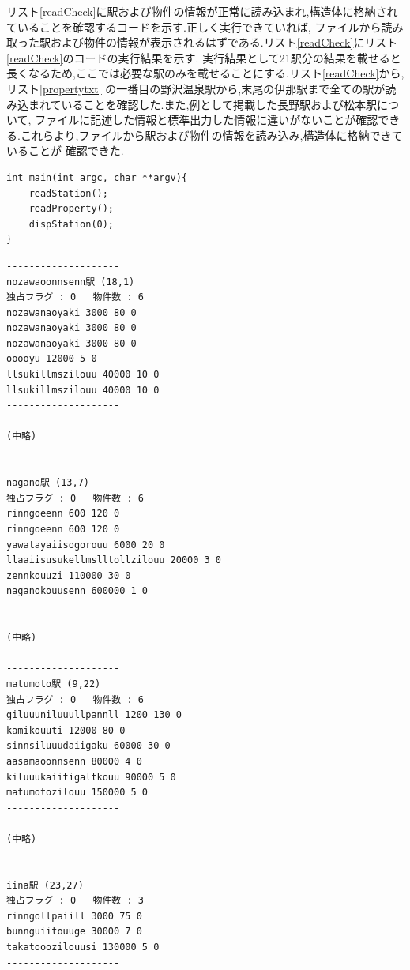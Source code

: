 \documentclass[a4j]{jarticle}
\begin{document}
    リスト\ref{readCheck}に駅および物件の情報が正常に読み込まれ,構造体に格納されていることを確認するコードを示す.正しく実行できていれば,
    ファイルから読み取った駅および物件の情報が表示されるはずである.リスト\ref{readCheck}にリスト\ref{readCheck}のコードの実行結果を示す.
    実行結果として21駅分の結果を載せると長くなるため,ここでは必要な駅のみを載せることにする.リスト\ref{readCheck}から,リスト\ref{propertytxt}
    の一番目の野沢温泉駅から,末尾の伊那駅まで全ての駅が読み込まれていることを確認した.また,例として掲載した長野駅および松本駅について,
    ファイルに記述した情報と標準出力した情報に違いがないことが確認できる.これらより,ファイルから駅および物件の情報を読み込み,構造体に格納できていることが
    確認できた.
    \begin{lstlisting}[basicstyle=\ttfamily\footnotesize, frame=single,label=readCheck,caption=駅および物件読み込みの動作確認]
int main(int argc, char **argv){
    readStation();
    readProperty();
    dispStation(0);
}
          \end{lstlisting} 

    \begin{lstlisting}[basicstyle=\ttfamily\footnotesize, frame=single,label=readResult,caption=リスト\ref{readCheck}の実行結果]
--------------------
nozawaoonnsenn駅 (18,1)
独占フラグ : 0   物件数 : 6
nozawanaoyaki 3000 80 0
nozawanaoyaki 3000 80 0
nozawanaoyaki 3000 80 0
ooooyu 12000 5 0
llsukillmszilouu 40000 10 0
llsukillmszilouu 40000 10 0
--------------------

(中略)

--------------------
nagano駅 (13,7)
独占フラグ : 0   物件数 : 6
rinngoeenn 600 120 0
rinngoeenn 600 120 0
yawatayaiisogorouu 6000 20 0
llaaiisusukellmslltollzilouu 20000 3 0
zennkouuzi 110000 30 0
naganokouusenn 600000 1 0
--------------------

(中略)

--------------------
matumoto駅 (9,22)
独占フラグ : 0   物件数 : 6
giluuuniluuullpannll 1200 130 0
kamikouuti 12000 80 0
sinnsiluuudaiigaku 60000 30 0
aasamaoonnsenn 80000 4 0
kiluuukaiitigaltkouu 90000 5 0
matumotozilouu 150000 5 0
--------------------

(中略)

--------------------
iina駅 (23,27)
独占フラグ : 0   物件数 : 3
rinngollpaiill 3000 75 0
bunnguiitouuge 30000 7 0
takatooozilouusi 130000 5 0
--------------------
          \end{lstlisting} 
\end{document}
